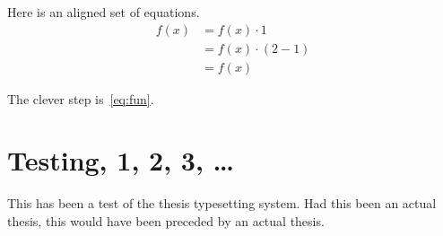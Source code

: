 \documentclass[phd, print]{nuthesis}
\begin{document}
Here is an aligned set of equations.
\begin{align}
f(x) &= f(x) \cdot 1 \\
     &= f(x) \cdot (2-1)\label{eq:fun}\\
     &= f(x)
\end{align}

The clever step is~\eqref{eq:fun}.

\backmatter

\appendix

\chapter{Testing, 1, 2, 3, \ldots}

This has been a test of the thesis typesetting system.
Had this been an actual thesis, this would have been
preceded by an actual thesis.

\begin{onehalfspacing}


\end{onehalfspacing}

\end{document}
